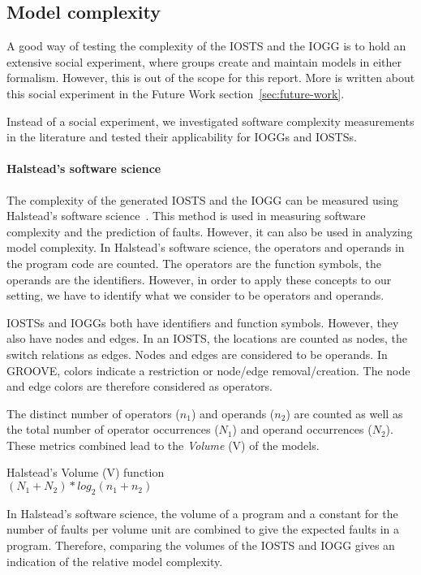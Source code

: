 \subsection{Model complexity}\label{sec:complexity_measurement}
A good way of testing the complexity of the IOSTS and the IOGG is to hold an extensive social experiment, where groups create and maintain models in either formalism. However, this is out of the scope for this report. More is written about this social experiment in the Future Work section~\ref{sec:future-work}.

Instead of a social experiment, we investigated software complexity measurements in the literature and tested their applicability for IOGGs and IOSTSs. 

\paragraph*{Halstead's software science} The complexity of the generated IOSTS and the IOGG can be measured using Halstead's software science~\cite{Halstead:software-science}. This method is used in measuring software complexity and the prediction of faults. However, it can also be used in analyzing model complexity. In Halstead's software science, the operators and operands in the program code are counted. The operators are the function symbols, the operands are the identifiers. However, in order to apply these concepts to our setting, we have to identify what we consider to be operators and operands.

IOSTSs and IOGGs both have identifiers and function symbols. However, they also have nodes and edges. In an IOSTS, the locations are counted as nodes, the switch relations as edges. Nodes and edges are considered to be operands. In GROOVE, colors indicate a restriction or node/edge removal/creation. The node and edge colors are therefore considered as operators.

The distinct number of operators ($n_1$) and operands ($n_2$) are counted as well as the total number of operator occurrences ($N_1$) and operand occurrences ($N_2$). These metrics combined lead to the \textit{Volume} (V) of the models.
\vspace{10px}\begin{definition} Halstead's Volume (V) function \\
$(N_1+N_2)*\mathit{log}_2(n_1+n_2)$
\end{definition}\vspace{10px}
In Halstead's software science, the volume of a program and a constant for the number of faults per volume unit are combined to give the expected faults in a program. Therefore, comparing the volumes of the IOSTS and IOGG gives an indication of the relative model complexity.

